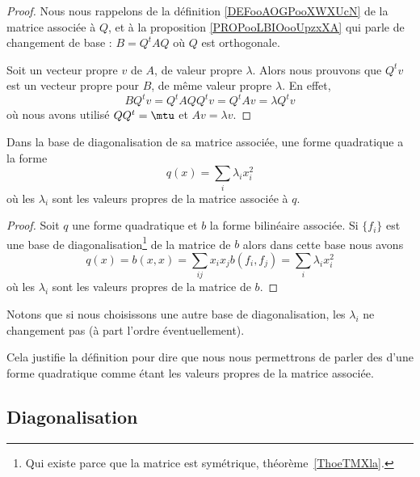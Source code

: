 \begin{proof}
    Nous nous rappelons de la définition \ref{DEFooAOGPooXWXUcN} de la matrice associée à \( Q\), et à la proposition \ref{PROPooLBIOooUpzxXA} qui parle de changement de base : \( B=Q^tAQ\) où \( Q\) est orthogonale.

    Soit un vecteur propre \( v\) de \(A \), de valeur propre \( \lambda\). Alors nous prouvons que \( Q^tv\) est un vecteur propre pour \( B\), de même valeur propre \( \lambda\). En effet,
    \begin{equation}
        BQ^tv=Q^tAQQ^tv=Q^tAv=\lambda Q^tv
    \end{equation}
    où nous avons utilisé \( QQ^t=\mtu\) et \( Av=\lambda v\).
\end{proof}

\begin{proposition}\label{PropFWYooQXfcVY}
    Dans la base de diagonalisation de sa matrice associée, une forme quadratique a la forme
    \begin{equation}
        q(x)=\sum_i\lambda_ix_i^2
    \end{equation}
    où les \( \lambda_i\) sont les valeurs propres de la matrice associée à \( q\).
\end{proposition}

\begin{proof}
    Soit \( q\) une forme quadratique et \( b\) la forme bilinéaire associée. Si \( \{ f_i \}\) est une base de diagonalisation\footnote{Qui existe parce que la matrice est symétrique, théorème~\ref{ThoeTMXla}.} de la matrice de \( b\) alors dans cette base nous avons
\begin{equation}
    q(x)=b(x,x)=\sum_{ij}x_ix_jb(f_i,f_j)=\sum_i\lambda_ix_i^2
\end{equation}
où les \( \lambda_i\) sont les valeurs propres de la matrice de \( b\).
\end{proof}

Notons que si nous choisissons une autre base de diagonalisation, les \( \lambda_i\) ne changement pas (à part l'ordre éventuellement). 

Cela justifie la définition pour dire que nous nous permettrons de parler des  d'une forme quadratique comme étant les valeurs propres de la matrice associée.

\subsection{Diagonalisation}

